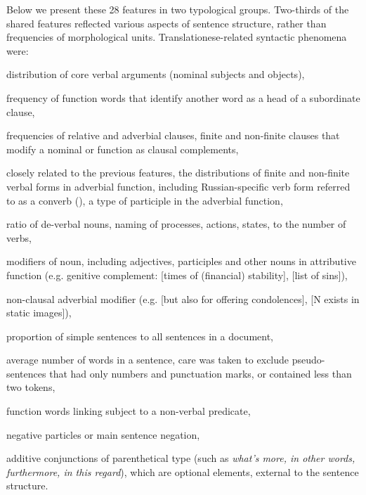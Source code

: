 Below we present these 28 features in two typological groups. Two-thirds of the shared features reflected various aspects of sentence structure, rather than frequencies of morphological units. Translationese-related syntactic phenomena were: 
\begin{description}\compresslist{}
	\item[nsubj, obj:] distribution of core verbal arguments (nominal subjects and objects),
	\item[mark:] frequency of function words that identify another word as a head of a subordinate clause,
	\item[acl:relcl, advcl, acl, ccomp:] frequencies of relative and adverbial clauses, finite and non-finite clauses that modify a nominal or function as clausal complements,  %
	\item[finites, pverbals:] closely related to the previous features, the distributions of finite and non-finite verbal forms in adverbial function, including Russian-specific verb form referred to as a converb (), a type of participle in the adverbial function,
	\item[deverbals:] ratio of de-verbal nouns, naming of processes, actions, states, to the number of verbs,
	\item[amod, attrib, nmod:] modifiers of noun, including adjectives, participles and other nouns in attributive function (e.g. genitive complement:  [times of (financial) stability],  [list of sins]),
	\item[advmod:] non-clausal adverbial modifier (e.g.  [but also for offering condolences],  [N exists in static images]),
	\item[simple:] proportion of simple sentences to all sentences in a document, 
	\item[sentlength:] average number of words in a sentence, care was taken to exclude pseudo-sentences that had only numbers and punctuation marks, or contained less than two tokens,
	\item[copula:] function words linking subject to a non-verbal predicate, 
	\item[neg:] negative particles or main sentence negation,
	\item[addit:] additive conjunctions of parenthetical type (such as \textit{what's more, in other words, furthermore, in this regard}), which are optional elements, external to the sentence structure.
\end{description}
